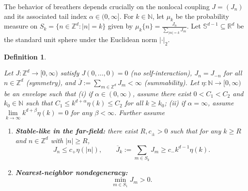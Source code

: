 \documentclass{article}
\numberwithin{equation}{section}
\newtheorem{definition}{Definition}[section]
\begin{document}
The behavior of breathers depends crucially on the nonlocal coupling $J = (J_n)$ and its associated tail index $\alpha \in (0,\infty]$. For $k \in \mathbb{N}$, let $\mu_k$ be the probability measure on $S_k = \{n \in \mathbb{Z}^d: |n|=k\}$ given by $\mu_k \{n\} = \frac{J_n}{\sum\limits_{|m|=k} J_m}$. Let $\mathbb{S}^{d-1} \subseteq \mathbb{R}^d$ be the standard unit sphere under the Euclidean norm $|\cdot|_{2}$.

\begin{definition}\label{def:kernel}

Let $J:\mathbb{Z}^d \rightarrow [0,\infty)$ satisfy $J(0,\dots,0) = 0$ (no self-interaction), $J_{n} = J_{-n}$ for all $n \in \mathbb{Z}^d$ (symmetry), and $\overline{J} := \sum\limits_{m \in \mathbb{Z}^d} J_m < \infty$ (summability). Let $\eta:\mathbb{N} \rightarrow [0,\infty)$ be an envelope such that (i) if $\alpha \in (0,\infty)$, assume there exist $0< C_1 < C_2$ and $k_0 \in \mathbb{N}$ such that $C_1 \leq k^{d+\alpha} \eta(k) \leq C_2$ for all $k \geq k_{0}$; (ii) if $\alpha = \infty$, assume $\lim\limits_{k \rightarrow \infty} k^{d+\beta} \eta(k) = 0$ for any $\beta < \infty$. Further assume 
\begin{enumerate}
    \item[(I)] \textbf{Stable-like in the far-field:} there exist $R, c_{\pm} > 0$ such that for any $k \geq R$ and $n \in \mathbb{Z}^d$ with $|n| \geq R$, 
    \begin{equation*}
    J_n \leq c_{+} \eta(|n|),\qquad \overline{J}_k := \sum_{m \in S_k} J_m \geq c_{-} k^{d-1} \eta(k).    
    \end{equation*} 
    
    \item[(II)] \textbf{Nearest-neighbor nondegeneracy:}
    \begin{equation*}
        \min_{m \in S_1} J_m > 0.
    \end{equation*}    
\end{enumerate}
\end{definition}
\end{document}
